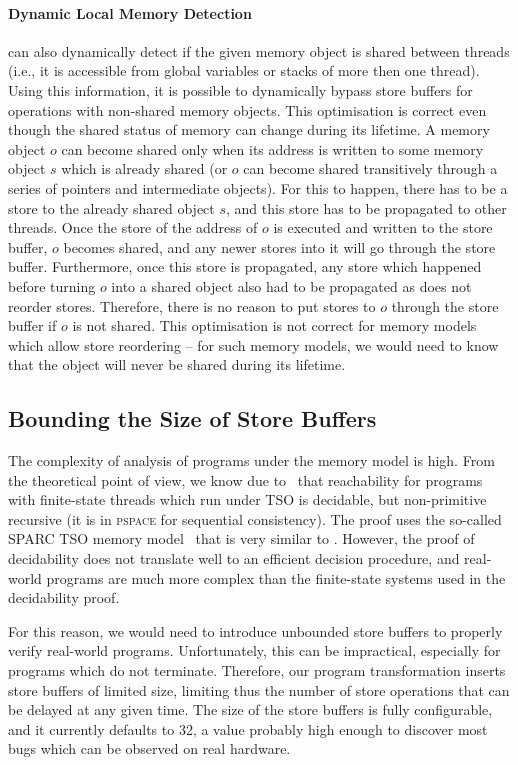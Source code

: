 \paragraph{Dynamic Local Memory Detection}
\divine can also dynamically detect if the given memory object is shared between threads (i.e., it is accessible from global variables or stacks of more then one thread).
Using this information, it is possible to dynamically bypass store buffers for operations with non-shared memory objects.
This optimisation is correct even though the shared status of memory can change during its lifetime.
A memory object $o$ can become shared only when its address is written to some memory object $s$ which is already shared (or $o$ can become shared transitively through a series of pointers and intermediate objects).
For this to happen, there has to be a store to the already shared object $s$, and this store has to be propagated to other threads.
Once the store of the address of $o$ is executed and written to the store buffer, $o$ becomes shared, and any newer stores into it will go through the store buffer.
Furthermore, once this store is propagated, any store which happened before turning $o$ into a shared object also had to be propagated as \xtso does not reorder stores.
Therefore, there is no reason to put stores to $o$ through the store buffer if $o$ is not shared.
This optimisation is not correct for memory models which allow store reordering -- for such memory models, we would need to know that the object will never be shared during its lifetime.

\subsection{Bounding the Size of Store Buffers}

The complexity of analysis of programs under the \xtso memory model is high.
From the theoretical point of view, we know due to~ that reachability for programs with finite-state threads which run under TSO is decidable, but non-primitive recursive (it is in \textsc{pspace} for sequential consistency).
The proof uses the so-called SPARC TSO memory model~ that is very similar to \xtso. However, the proof of decidability does not translate well to an efficient decision procedure, and real-world programs are much more complex than the finite-state systems used in the decidability proof.

For this reason, we would need to introduce unbounded store buffers to properly
verify real-world programs. Unfortunately, this can be impractical, especially for programs which do not terminate.
Therefore, our program transformation
inserts store buffers of limited size, limiting thus the number of store
operations that can be delayed at any given time. The
size of the store buffers is fully configurable, and it currently defaults to
32, a value probably high enough to discover most bugs which can be observed on
real hardware.

